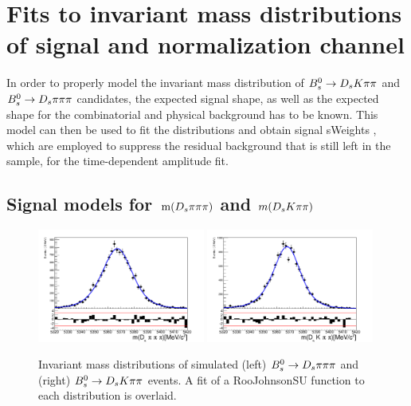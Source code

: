 \section{Fits to invariant mass distributions of signal and normalization channel}
\label{sec: massfits}

In order to properly model the invariant mass distribution of ${{B}^0_{s}}\rightarrow{\ensuremath{{D}_{s}}}{\ensuremath{K}}{\ensuremath{\pi}}{\ensuremath{\pi}}$ and ${{B}^0_{s}}\rightarrow{\ensuremath{{D}_{s}}}{\ensuremath{\pi}}{\ensuremath{\pi}}{\ensuremath{\pi}}$ candidates, 
the expected signal shape, as well as the expected shape for the combinatorial and physical background has to be known. 
This model can then be used to fit the distributions and obtain signal sWeights \cite{Pivk:2004ty}, 
which are employed to suppress the residual background that is still left in the sample, for the time-dependent amplitude fit.   

\subsection{Signal models for $\mathrm{ \,m}({{D}_{s}}{\pi}{\pi}{\pi})$ and $m({{D}_{s}}{K}{\pi}{\pi})$}
\label{subsec: signalmodel}

\begin{figure}[h]
\includegraphics[height=7.cm,width=0.49\textwidth]{figs/MassFit/normMC_pull.pdf}
\includegraphics[height=7.cm,width=0.49\textwidth]{figs/MassFit/signalMC_pull.pdf}
\caption{Invariant mass distributions of simulated (left) ${{B}^0_{s}}\rightarrow{\ensuremath{{D}_{s}}}{\ensuremath{\pi}}{\ensuremath{\pi}}{\ensuremath{\pi}}$ and (right) ${{B}^0_{s}}\rightarrow{\ensuremath{{D}_{s}}}{\ensuremath{K}}{\ensuremath{\pi}}{\ensuremath{\pi}}$ events. A fit of a RooJohnsonSU function to each distribution is overlaid.}
\label{fig: BsMassShapes}
\end{figure}

